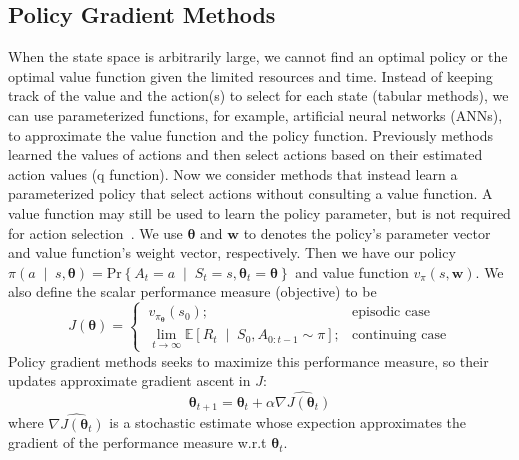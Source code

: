 \documentclass{article}
\begin{document}
\subsection{Policy Gradient Methods}
\noindent When the state space is arbitrarily large, we cannot find an optimal 
policy or the optimal value function given the limited resources and time. 
Instead of keeping track of the value and the action(s) to select for each 
state (tabular methods), we can use parameterized functions, for example, 
artificial neural networks (ANNs), to approximate the value function and the 
policy function.
\vspace{3mm}\newline Previously methods learned the values of actions and then
select actions based on their estimated action values (q function). Now we
consider methods that instead learn a parameterized policy that select actions
without consulting a value function. A value function may still be used to
learn the policy parameter, but is not required for action 
selection~\cite{Sutton1998}.
\vspace{3mm}\newline We use \(\bm{\theta}\) and \(\bm{w}\) to denotes the
policy's parameter vector and value function's weight vector, respectively.
Then we have our policy \(\pi\left(a\;\middle|\;s, \bm{\theta}\right)
=\text{Pr}\left\{A_t=a\;\middle|\;S_t=s, \bm{\theta}_t=\bm{\theta}\right\}\) and
value function \(v_\pi(s, \bm{w})\). We also define the scalar performance
measure (objective) to be
\[J(\bm{\theta})=\begin{cases}
    \ v_{\pi_{\bm{\theta}}}(s_0); &\text{episodic case}\\
    \ \lim_{t \to \infty} \mathbb{E}
    \left[R_t\;\middle|\;S_0,A_{0:t-1}\sim\pi\right];
                                  & \text{continuing case}
\end{cases}\]
Policy gradient methods seeks to maximize this performance measure, so their
updates approximate gradient ascent in \(J\):
\[\bm{\theta}_{t+1}=\bm{\theta}_t+\alpha\widehat{\nabla J(\bm{\theta}_t)}\]
where \(\widehat{\nabla J(\bm{\theta}_t)}\) is a stochastic estimate whose
expection approximates the gradient of the performance measure w.r.t
\(\bm{\theta}_t\).
\end{document}
